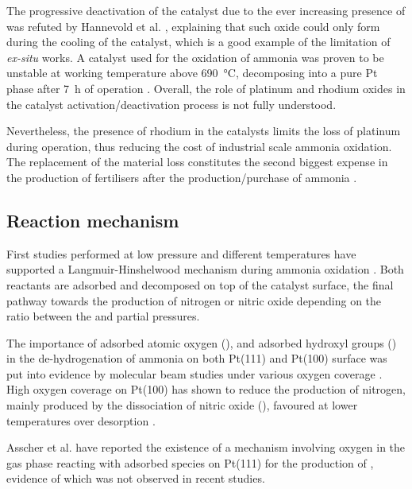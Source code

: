 The progressive deactivation of the catalyst due to the ever increasing presence of  \parencite{McCabe1986} was refuted by Hannevold et al. \parencite*{Hannevold2005}, explaining that such oxide could only form during the cooling of the catalyst, which is a good example of the limitation of \textit{ex-situ} works.
A  catalyst used for the oxidation of ammonia was proven to be unstable at working temperature above \qty{690}{\degreeCelsius}, decomposing into a pure Pt phase after \qty{7}{\hour} of operation \parencite{Zakharchenko2001}.
Overall, the role of platinum and rhodium oxides in the catalyst activation/deactivation process is not fully understood.

Nevertheless, the presence of rhodium in the catalysts limits the loss of platinum during operation, thus reducing the cost of industrial scale ammonia oxidation.
The replacement of the material loss constitutes the second biggest expense in the production of fertilisers after the production/purchase of ammonia \parencite{Hatscher2008}.

\subsection{Reaction mechanism}\label{sec:Mechanism}

First studies performed at low pressure and different temperatures have supported a Langmuir-Hinshelwood mechanism during ammonia oxidation \parencite{Nutt1969, Pignet1974, Ostermaier1974, Pignet1975, Gland1978a}.
Both reactants are adsorbed and decomposed on top of the catalyst surface, the final pathway towards the production of nitrogen or nitric oxide depending on the ratio between the  and  partial pressures.

The importance of adsorbed atomic oxygen (), and adsorbed hydroxyl groups () in the de-hydrogenation of ammonia on both Pt(111) \parencite{Mieher1995} and Pt(100) surface was put into evidence by molecular beam studies under various oxygen coverage \parencite{Bradley1995, Bradley1997, vandenBroek1999, Kim2000}.
High oxygen coverage on Pt(100) has shown to reduce the production of nitrogen, mainly produced by the dissociation of nitric oxide (), favoured at lower temperatures over  desorption \parencite{Bradley1995}.

Asscher et al. \parencite*{Asscher1984} have reported the existence of a mechanism involving oxygen in the gas phase reacting with adsorbed  species on Pt(111) for the production of , evidence of which was not observed in recent studies.

